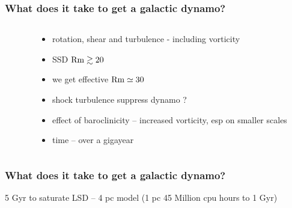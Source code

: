 \documentclass{beamer}
\newcommand\Rm{{\rm Rm} }
\begin{document}
    \begin{frame}
      \frametitle{What does it take to get a galactic dynamo?}
    \begin{columns}
      \begin{column}[]{6.5cm}
      {\footnotesize{\cite{Gent:2013b}}}
      \end{column}
      \begin{column}[]{6.25cm}
      {\footnotesize{
      \begin{itemize}
        \item rotation, shear and turbulence - including vorticity
        \item SSD $\Rm\gtrsim20$ \cite{SBK02,HB04,Schober12,SBSW20}
        \item we get effective $\Rm\simeq30$ \cite{HSSFG17}
        \item shock turbulence suppress dynamo \cite{Haugen:2004M,FCSBKS11,FSBS14}?
        \item effect of baroclinicity -- increased vorticity, esp on smaller scales \cite{KGVS18,SF22}
	\item time -- over a gigayear
      \end{itemize}
       \vspace{-0.2cm}
      }}
      \end{column}
    \end{columns}
    \end{frame}
    \begin{frame}
	    \begin{center}
      \frametitle{What does it take to get a galactic dynamo?}
	    
{\footnotesize{5 Gyr to saturate LSD -- 4 pc model (1 pc 45 Million cpu hours to 1 Gyr)}}
	    \end{center}
    \end{frame}
\end{document}
